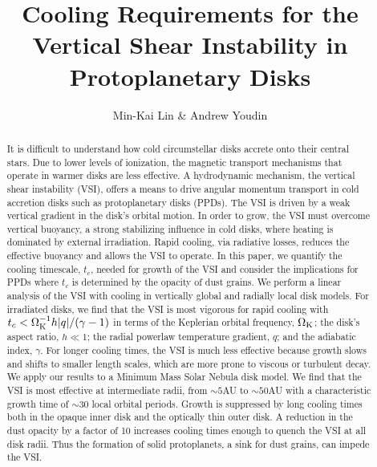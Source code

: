 \documentclass[iop]{emulateapj}
\def \OmK {\Omega_{\rm K}}
\begin{document}
\title{Cooling Requirements for the Vertical Shear Instability 
  in Protoplanetary Disks}
\author{Min-Kai Lin \& Andrew Youdin}

\begin{abstract}
  It is difficult to understand how cold circumstellar disks accrete onto their central stars.  Due to 
  lower levels of ionization, the magnetic transport mechanisms that
  operate in warmer disks are less effective.  
  A hydrodynamic mechanism, the vertical shear instability (VSI), offers a means to drive angular momentum 
  transport in cold accretion disks such as protoplanetary disks (PPDs).  
  The VSI is driven by a weak vertical gradient in the disk's orbital motion.
  In order to grow, the VSI must overcome vertical buoyancy, a strong
  stabilizing influence in cold disks, where  
  heating is dominated by external irradiation.  Rapid cooling, via
  radiative losses, reduces the effective buoyancy 
  and allows the VSI to operate.  In this paper, we quantify the
  cooling timescale, $t_c$, needed for growth of the VSI 
  and consider the implications for PPDs where $t_c$ is determined by the opacity of dust 
  grains.  We perform a linear analysis of the VSI with cooling in
  vertically global and radially local disk models. 
  For irradiated disks, we find that the VSI is most vigorous for
  rapid cooling with $t_c < \OmK^{-1}  h |q| / (\gamma -1)$ 
  in terms of the Keplerian orbital frequency, $\OmK$; the disk's
  aspect ratio, $ h \ll 1$; the radial  
  powerlaw temperature gradient, $q$; and the adiabatic index,
  $\gamma$.  For longer cooling times, the VSI  
  is much less effective because growth slows and shifts to smaller length scales, which are more prone to 
  viscous or turbulent decay.  We apply our results to a  Minimum Mass Solar Nebula disk model.  We
  find that the VSI is most effective at intermediate radii, from $\sim 5$AU to $\sim 50$AU with a
  characteristic growth time of $\sim 30$ local orbital periods.
  Growth is suppressed by long cooling times both in the opaque  
  inner disk and the optically thin outer disk.  A reduction in the
  dust opacity by a factor of 10 increases cooling times  
  enough to quench the VSI at all disk radii.  Thus the formation of
  solid protoplanets, a sink for dust grains, can impede the VSI. 
\end{abstract}
\end{document}

